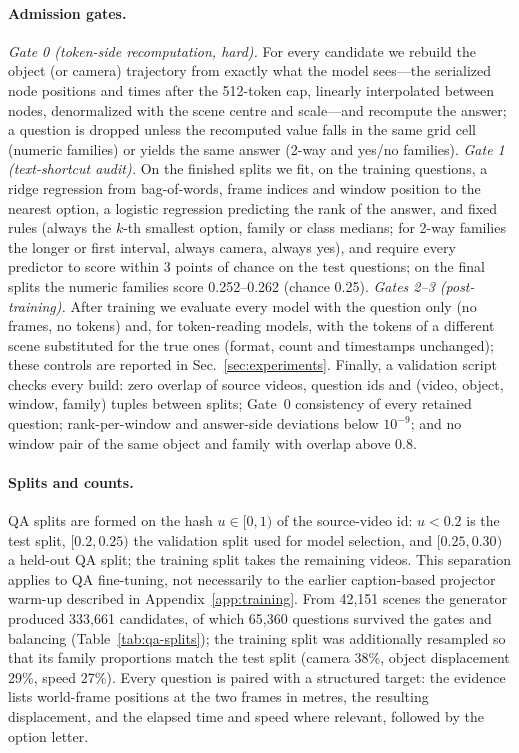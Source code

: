 \paragraph{Admission gates.}
\emph{Gate 0 (token-side recomputation, hard).} For every candidate we rebuild the object (or camera) trajectory from exactly what the model sees---the serialized node positions and times after the 512-token cap, linearly interpolated between nodes, denormalized with the scene centre and scale---and recompute the answer; a question is dropped unless the recomputed value falls in the same grid cell (numeric families) or yields the same answer (2-way and yes/no families).
\emph{Gate 1 (text-shortcut audit).} On the finished splits we fit, on the training questions, a ridge regression from bag-of-words, frame indices and window position to the nearest option, a logistic regression predicting the rank of the answer, and fixed rules (always the $k$-th smallest option, family or class medians; for 2-way families the longer or first interval, always camera, always yes), and require every predictor to score within 3 points of chance on the test questions; on the final splits the numeric families score 0.252--0.262 (chance 0.25).
\emph{Gates 2--3 (post-training).} After training we evaluate every model with the question only (no frames, no tokens) and, for token-reading models, with the tokens of a different scene substituted for the true ones (format, count and timestamps unchanged); these controls are reported in Sec.~\ref{sec:experiments}.
Finally, a validation script checks every build: zero overlap of source videos, question ids and (video, object, window, family) tuples between splits; Gate~0 consistency of every retained question; rank-per-window and answer-side deviations below $10^{-9}$; and no window pair of the same object and family with overlap above 0.8.

\paragraph{Splits and counts.}
QA splits are formed on the hash $u\in[0,1)$ of the source-video id: $u<0.2$ is the test split, $[0.2,0.25)$ the validation split used for model selection, and $[0.25,0.30)$ a held-out QA split; the training split takes the remaining videos. This separation applies to QA fine-tuning, not necessarily to the earlier caption-based projector warm-up described in Appendix~\ref{app:training}.
From 42,151 scenes the generator produced 333,661 candidates, of which 65,360 questions survived the gates and balancing (Table~\ref{tab:qa-splits}); the training split was additionally resampled so that its family proportions match the test split (camera 38\%, object displacement 29\%, speed 27\%).
Every question is paired with a structured target: the evidence lists world-frame positions at the two frames in metres, the resulting displacement, and the elapsed time and speed where relevant, followed by the option letter.

